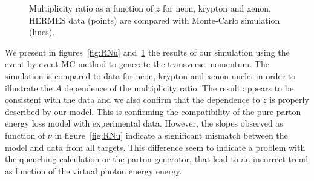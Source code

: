 \begin{figure}[tbp]
  \centering
{}
\caption {Multiplicity ratio as a function of $z$ for neon, krypton and xenon. 
HERMES data \cite{Airapetian:2011jp} (points) are compared with Monte-Carlo 
simulation (lines).}
\label{fig:Rz}
\end{figure}

We present in figures~\ref{fig:RNu} and~\ref{fig:Rz} the results of our simulation using the event by event MC method to generate the transverse momentum. The simulation is compared to data for neon, krypton and xenon nuclei in order to illustrate the $A$ dependence of the multiplicity ratio. The result appears to be consistent with the data and we also confirm that the dependence to $z$ is properly described by our model. This is confirming the compatibility of the pure parton energy loss model with experimental data. However, the slopes observed as function of $\nu$ in figure~\ref{fig:RNu} indicate a significant mismatch between the model and data from all targets. This difference seem to indicate a problem with the quenching calculation or the parton generator, that lead to an incorrect trend as function of the virtual photon energy energy.

